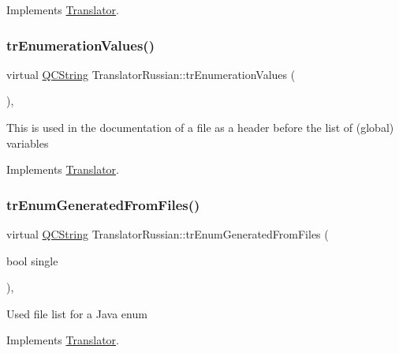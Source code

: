 Implements \mbox{\hyperlink{class_translator}{Translator}}.

\mbox{\label{class_translator_russian_aed0e2b5f8e3460c2334beb6151cb65ae}} 
\subsubsection{\texorpdfstring{trEnumerationValues()}{trEnumerationValues()}}
{\footnotesize\ttfamily virtual \mbox{\hyperlink{class_q_c_string}{Q\+C\+String}} Translator\+Russian\+::tr\+Enumeration\+Values (\begin{DoxyParamCaption}{ }\end{DoxyParamCaption})\hspace{0.3cm}{\ttfamily [inline]}, {\ttfamily [virtual]}}

This is used in the documentation of a file as a header before the list of (global) variables 

Implements \mbox{\hyperlink{class_translator}{Translator}}.

\mbox{\label{class_translator_russian_a25a2331d5c992eb1703dfe523e8c2586}} 
\subsubsection{\texorpdfstring{trEnumGeneratedFromFiles()}{trEnumGeneratedFromFiles()}}
{\footnotesize\ttfamily virtual \mbox{\hyperlink{class_q_c_string}{Q\+C\+String}} Translator\+Russian\+::tr\+Enum\+Generated\+From\+Files (\begin{DoxyParamCaption}\item[{bool}]{single }\end{DoxyParamCaption})\hspace{0.3cm}{\ttfamily [inline]}, {\ttfamily [virtual]}}

Used file list for a Java enum 

Implements \mbox{\hyperlink{class_translator}{Translator}}.

\mbox{\label{class_translator_russian_a87fa3665bfe0c2cacb95b39a73e87fad}} 
